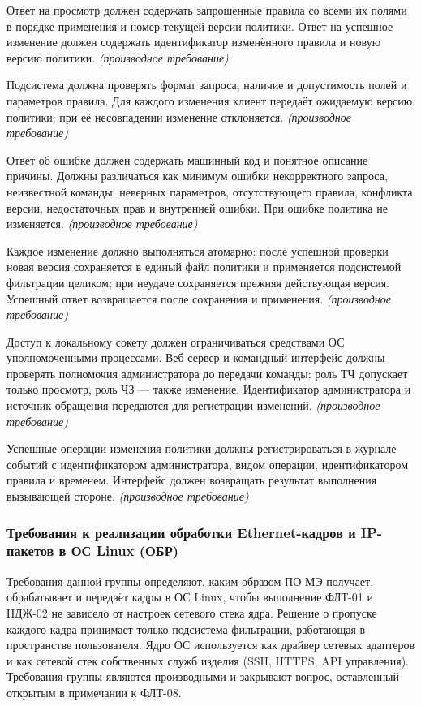\documentclass[12pt,a4paper,final]{article}
\newenvironment{reqs}
  {\begin{description}[style=sameline,leftmargin=2.2cm,labelwidth=2.0cm,
     labelsep=0.2cm,font=\normalfont\bfseries,itemsep=3pt]}
  {\end{description}}
\newcommand{\der}{\textit{(производное требование)}}
\begin{document}
\begin{reqs}
\item[АПИ-07] Ответ на просмотр должен содержать запрошенные правила со всеми их полями в порядке применения и номер текущей версии политики. Ответ на успешное изменение должен содержать идентификатор изменённого правила и новую версию политики. \der
\item[АПИ-08] Подсистема должна проверять формат запроса, наличие и допустимость полей и параметров правила. Для каждого изменения клиент передаёт ожидаемую версию политики; при её несовпадении изменение отклоняется. \der
\item[АПИ-09] Ответ об ошибке должен содержать машинный код и понятное описание причины. Должны различаться как минимум ошибки некорректного запроса, неизвестной команды, неверных параметров, отсутствующего правила, конфликта версии, недостаточных прав и внутренней ошибки. При ошибке политика не изменяется. \der
\item[АПИ-10] Каждое изменение должно выполняться атомарно: после успешной проверки новая версия сохраняется в единый файл политики и применяется подсистемой фильтрации целиком; при неудаче сохраняется прежняя действующая версия. Успешный ответ возвращается после сохранения и применения. \der
\item[АПИ-11] Доступ к локальному сокету должен ограничиваться средствами ОС уполномоченными процессами. Веб-сервер и командный интерфейс должны проверять полномочия администратора до передачи команды: роль ТЧ допускает только просмотр, роль ЧЗ --- также изменение. Идентификатор администратора и источник обращения передаются для регистрации изменений. \der
\item[АПИ-12] Успешные операции изменения политики должны регистрироваться в журнале событий с идентификатором администратора, видом операции, идентификатором правила и временем. Интерфейс должен возвращать результат выполнения вызывающей стороне. \der
\end{reqs}

\subsubsection{Требования к реализации обработки Ethernet-кадров и IP-пакетов в ОС Linux (ОБР)}\label{sec:impl}

Требования данной группы определяют, каким образом ПО МЭ получает, обрабатывает
и передаёт кадры в ОС Linux, чтобы выполнение ФЛТ-01 и НДЖ-02 не зависело
от настроек сетевого стека ядра. Решение о пропуске каждого кадра принимает
только подсистема фильтрации, работающая в пространстве пользователя. Ядро ОС
используется как драйвер сетевых адаптеров и как сетевой стек собственных
служб изделия (SSH, HTTPS, API управления). Требования группы являются
производными и закрывают вопрос, оставленный открытым в примечании к ФЛТ-08.
\end{document}

